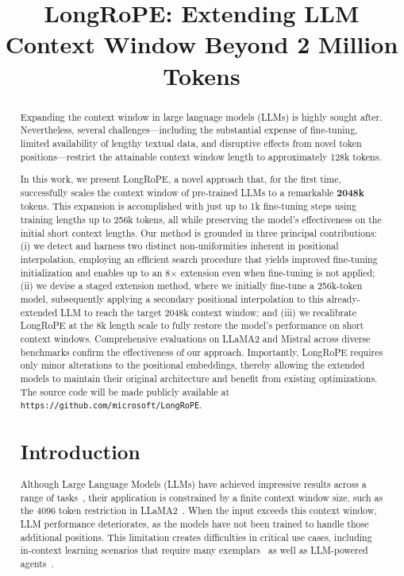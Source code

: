 \title{LongRoPE: Extending LLM Context Window Beyond 2 Million Tokens}

\begin{abstract}
Expanding the context window in large language models (LLMs) is highly sought after. Nevertheless, several challenges—including the substantial expense of fine-tuning, limited availability of lengthy textual data, and disruptive effects from novel token positions—restrict the attainable context window length to approximately 128k tokens.

In this work, we present LongRoPE, a novel approach that, for the first time, successfully scales the context window of pre-trained LLMs to a remarkable \textbf{2048k} tokens. This expansion is accomplished with just up to 1k fine-tuning steps using training lengths up to 256k tokens, all while preserving the model's effectiveness on the initial short context lengths. Our method is grounded in three principal contributions: (i) we detect and harness two distinct non-uniformities inherent in positional interpolation, employing an efficient search procedure that yields improved fine-tuning initialization and enables up to an 8$\times$ extension even when fine-tuning is not applied; (ii) we devise a staged extension method, where we initially fine-tune a 256k-token model, subsequently applying a secondary positional interpolation to this already-extended LLM to reach the target 2048k context window; and (iii) we recalibrate LongRoPE at the 8k length scale to fully restore the model's performance on short context windows. Comprehensive evaluations on LLaMA2 and Mistral across diverse benchmarks confirm the effectiveness of our approach. Importantly, LongRoPE requires only minor alterations to the positional embeddings, thereby allowing the extended models to maintain their original architecture and benefit from existing optimizations. The source code will be made publicly available at \texttt{https://github.com/microsoft/LongRoPE}.

\section{Introduction}

Although Large Language Models (LLMs) have achieved impressive results across a range of tasks~\cite{gpt4,llama2}, their application is constrained by a finite context window size, such as the 4096 token restriction in LLaMA2~\cite{llama2}. When the input exceeds this context window, LLM performance deteriorates, as the models have not been trained to handle those additional positions. This limitation creates difficulties in critical use cases, including in-context learning scenarios that require many exemplars~\cite{Huang2023FewerIM} as well as LLM-powered agents~\cite{park2023generative,madaan2023selfrefine}.


\end{abstract}
